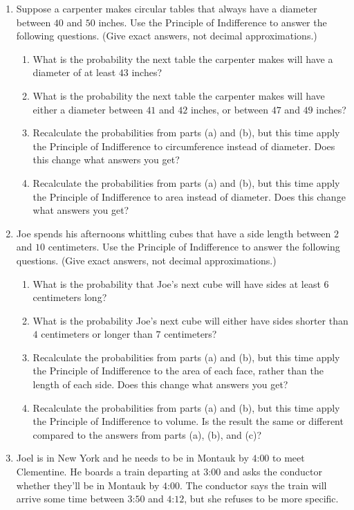 \documentclass[justified]{tufte-book}
\providecommand{\tightlist}{%
  \setlength{\itemsep}{0pt}\setlength{\parskip}{0pt}}
\theoremstyle{definition}
\theoremstyle{definition}
\theoremstyle{definition}
\theoremstyle{definition}
\theoremstyle{remark}
\begin{document}
\begin{enumerate}
\item
  Suppose a carpenter makes circular tables that always have a diameter between \(40\) and \(50\) inches. Use the Principle of Indifference to answer the following questions. (Give exact answers, not decimal approximations.)

  \begin{enumerate}
  \def\labelenumii{\alph{enumii}.}
  \tightlist
  \item
    What is the probability the next table the carpenter makes will have a diameter of at least \(43\) inches?
  \item
    What is the probability the next table the carpenter makes will have either a diameter between \(41\) and \(42\) inches, or between \(47\) and \(49\) inches?
  \item
    Recalculate the probabilities from parts (a) and (b), but this time apply the Principle of Indifference to circumference instead of diameter. Does this change what answers you get?
  \item
    Recalculate the probabilities from parts (a) and (b), but this time apply the Principle of Indifference to area instead of diameter. Does this change what answers you get?
  \end{enumerate}
\item
  Joe spends his afternoons whittling cubes that have a side length between \(2\) and \(10\) centimeters. Use the Principle of Indifference to answer the following questions. (Give exact answers, not decimal approximations.)

  \begin{enumerate}
  \def\labelenumii{\alph{enumii}.}
  \tightlist
  \item
    What is the probability that Joe's next cube will have sides at least \(6\) centimeters long?
  \item
    What is the probability Joe's next cube will either have sides shorter than \(4\) centimeters or longer than \(7\) centimeters?
  \item
    Recalculate the probabilities from parts (a) and (b), but this time apply the Principle of Indifference to the area of each face, rather than the length of each side. Does this change what answers you get?
  \item
    Recalculate the probabilities from parts (a) and (b), but this time apply the Principle of Indifference to volume. Is the result the same or different compared to the answers from parts (a), (b), and (c)?
  \end{enumerate}
\item
  Joel is in New York and he needs to be in Montauk by \(4\):\(00\) to meet Clementine. He boards a train departing at \(3\):\(00\) and asks the conductor whether they'll be in Montauk by \(4\):\(00\). The conductor says the train will arrive some time between \(3\):\(50\) and \(4\):\(12\), but she refuses to be more specific.


\end{enumerate}
\end{document}
